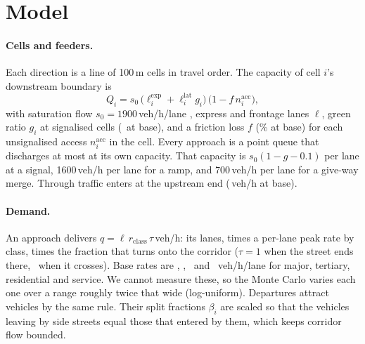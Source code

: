 \section{Model}
\label{sec:model}

\paragraph{Cells and feeders.} Each direction is a line of 100\,m cells
in travel order. The capacity of cell $i$'s downstream boundary is
\begin{equation}
Q_i = s_0\,\big(\ell^{\mathrm{exp}}_i + \ell^{\mathrm{lat}}_i g_i\big)\,
\big(1 - f\,n^{\mathrm{acc}}_i\big),
\end{equation}
with saturation flow $s_0 = 1900$\,veh/h/lane \cite{hcm2000}, express and
frontage lanes $\ell$, green ratio $g_i$ at signalised cells (\ThG\ at
base), and a friction loss $f$ (\ThFriction\% at base) for each
unsignalised access $n^{\mathrm{acc}}_i$ in the cell. Every approach is a
point queue that discharges at most at its own capacity. That capacity is
$s_0(1-g-0.1)$ per lane at a signal, 1600\,veh/h per lane for a ramp, and
700\,veh/h per lane for a give-way merge. Through traffic enters at the
upstream end (\ThUp\,veh/h at base).

\paragraph{Demand.} An approach delivers
$q = \ell\,r_{\mathrm{class}}\,\tau$\,veh/h: its lanes, times a per-lane
peak rate by class, times the fraction that turns onto the corridor
($\tau = 1$ when the street ends there, \ThTurnCross\ when it crosses).
Base rates are \ThQMajor, \ThQTertiary, \ThQMinor\ and \ThQService\
veh/h/lane for major, tertiary, residential and service. We cannot
measure these, so the Monte Carlo varies each one over a range roughly
twice that wide (log-uniform). Departures attract vehicles by the same
rule. Their split fractions $\beta_i$ are scaled so that the vehicles
leaving by side streets equal those that entered by them, which keeps
corridor flow bounded.

